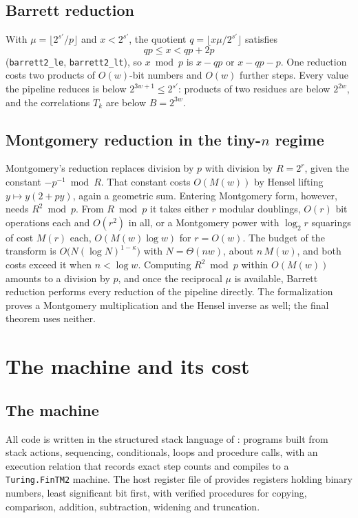 \documentclass[11pt]{amsart}
\newcommand{\lean}[1]{\texttt{#1}}
\begin{document}
\subsection{Barrett reduction}
With $\mu = \lfloor 2^{s'} / p \rfloor$ and $x < 2^{s'}$, the quotient
$q = \lfloor x\mu / 2^{s'} \rfloor$ satisfies
\[
  qp \le x < qp + 2p
\]
(\lean{barrett2\_le}, \lean{barrett2\_lt}), so $x \bmod p$ is $x - qp$ or $x - qp - p$. One
reduction costs two products of $O(w)$-bit numbers and $O(w)$ further steps. Every value the
pipeline reduces is below $2^{3w + 1} \le 2^{s'}$: products of two residues are below $2^{2w}$,
and the correlations $T_k$ are below $B = 2^{3w}$.

\subsection{Montgomery reduction in the tiny-\texorpdfstring{$n$}{n} regime}
\label{sec:montgomery}
Montgomery's reduction \cite{Mon} replaces division by $p$ with division by $R = 2^r$, given
the constant $-p^{-1} \bmod R$. That constant costs $O(M(w))$ by Hensel lifting
$y \mapsto y(2 + py)$, again a geometric sum. Entering Montgomery form, however, needs
$R^2 \bmod p$. From $R \bmod p$ it takes either $r$ modular doublings, $O(r)$ bit operations
each and $O(r^2)$ in all, or a Montgomery power with $\log_2 r$ squarings of cost $M(r)$ each,
$O(M(w) \log w)$ for $r = O(w)$. The budget of the transform is $O\bigl(N(\log N)^{1-\kappa}\bigr)$
with $N = \Theta(n w)$, about $n\, M(w)$, and both costs exceed it when $n < \log w$. Computing
$R^2 \bmod p$ within $O(M(w))$ amounts to a division by $p$, and once the reciprocal $\mu$ is
available, Barrett reduction performs every reduction of the pipeline directly. The
formalization proves a Montgomery multiplication and the Hensel inverse as well; the final
theorem uses neither.

\section{The machine and its cost}
\label{sec:machine}

\subsection{The machine}
All code is written in the structured stack language of \cite{IMB}: programs built from stack
actions, sequencing, conditionals, loops and procedure calls, with an execution relation that
records exact step counts and compiles to a \lean{Turing.FinTM2} machine. The host register
file of \cite{IMB} provides registers holding binary numbers, least significant bit first, with
verified procedures for copying, comparison, addition, subtraction, widening and truncation.
\end{document}
